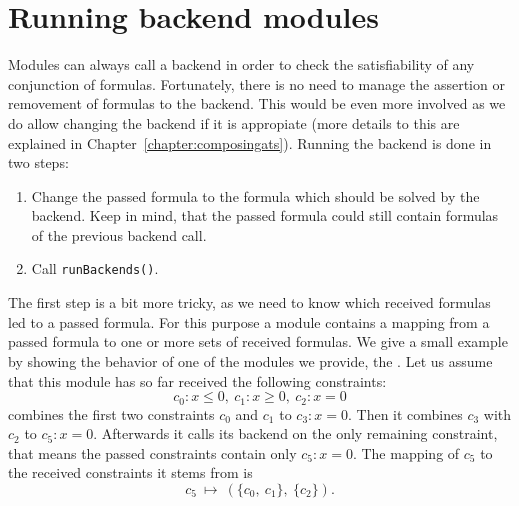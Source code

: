\section{Running backend modules}
\label{sec:runbackend}
Modules can always call a backend in order to check the satisfiability of any conjunction of formulas.
Fortunately, there is no need to manage the assertion or removement of formulas to the backend. 
This would be even more involved as we do allow changing the
backend if it is appropiate (more details to this are explained in Chapter~\ref{chapter:composingats}).
Running the backend is done in two steps:
\begin{enumerate}
	\item Change the passed formula to the formula which should be solved by the backend. Keep in mind,
	       that the passed formula could still contain formulas of the previous backend call.
	\item Call \texttt{runBackends()}.
\end{enumerate}
The first step is a bit more tricky, as we need to know which received formulas led to a passed
formula. For this purpose a module contains a mapping from a passed formula to one or more
sets of received formulas. We give a small example by showing the behavior of one of the modules
we provide, the \simplifierModuleClass. Let us assume that this module has so far received the following
constraints:
$$c_0:x\leq0,\ c_1:x\geq 0,\ c_2:x=0$$
\simplifierModuleClass combines the first two constraints $c_0$ and $c_1$ to $c_3:x=0$. Then it combines
$c_3$ with $c_2$ to $c_5:x=0$. Afterwards it calls its backend on the only remaining constraint,
that means the passed constraints contain only $c_5:x=0$. The mapping of $c_5$ to the received constraints it
stems from is $$c_5\ \mapsto\ (\{c_0,\ c_1\},\ \{c_2\}).$$

